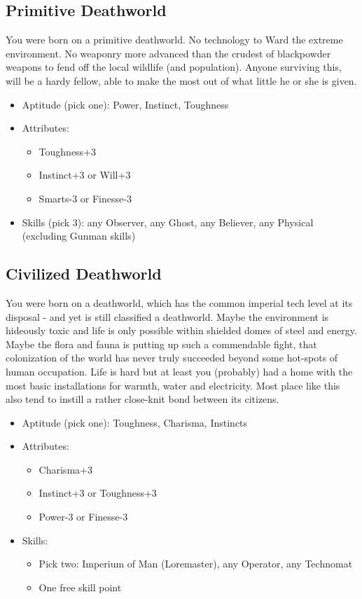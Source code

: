 \subsection{Primitive Deathworld}
You were born on a primitive deathworld. No technology to Ward the extreme environment. No weaponry more advanced than the crudest of blackpowder weapons to fend off the local wildlife (and population). Anyone surviving this, will be a hardy fellow, able to make the most out of what little he or she is given.

\begin{itemize}
	\item Aptitude (pick one): Power, Instinct, Toughness
	\item Attributes: 
	\begin{itemize}
		\item Toughness+3
		\item Instinct+3 or Will+3
		\item Smarts-3 or Finesse-3
	\end{itemize}
	\item Skills (pick 3): any Observer, any Ghost, any Believer, any Physical (excluding Gunman skills)
\end{itemize}

\subsection{Civilized Deathworld}
You were born on a deathworld, which has the common imperial tech level at its disposal - and yet is still classified a deathworld. Maybe the environment is hideously toxic and life is only possible within shielded domes of steel and energy. Maybe the flora and fauna is putting up such a commendable fight, that colonization of the world has never truly succeeded beyond some hot-spots of human occupation. Life is hard but at least you (probably) had a home with the most basic installations for warmth, water and electricity. Most place like this also tend to instill a rather close-knit bond between its citizens. 

\begin{itemize}
	\item Aptitude (pick one): Toughness, Charisma, Instincts
	\item Attributes:
	\begin{itemize}
		\item Charisma+3
		\item Instinct+3 or Toughness+3
		\item Power-3 or Finesse-3
	\end{itemize}
	\item Skills: 
	\begin{itemize}
	 	\item Pick two: Imperium of Man (Loremaster), any Operator, any Technomat
	 	\item One free skill point
	 \end{itemize} 
\end{itemize}

